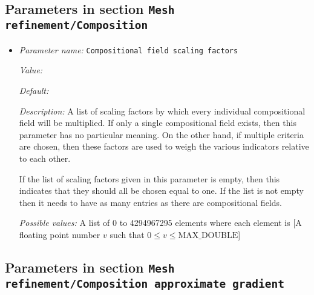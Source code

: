 \subsection{Parameters in section \tt Mesh refinement/Composition}
\label{parameters:Mesh_20refinement/Composition}

\begin{itemize}
\item {\it Parameter name:} {\tt Compositional field scaling factors}
\label{parameters:Mesh refinement/Composition/Compositional field scaling factors}
\label{parameters:Mesh_20refinement/Composition/Compositional_20field_20scaling_20factors}


{\it Value:} 


{\it Default:} 


{\it Description:} A list of scaling factors by which every individual compositional field will be multiplied. If only a single compositional field exists, then this parameter has no particular meaning. On the other hand, if multiple criteria are chosen, then these factors are used to weigh the various indicators relative to each other. 

If the list of scaling factors given in this parameter is empty, then this indicates that they should all be chosen equal to one. If the list is not empty then it needs to have as many entries as there are compositional fields.


{\it Possible values:} A list of 0 to 4294967295 elements where each element is [A floating point number $v$ such that $0 \leq v \leq \text{MAX\_DOUBLE}$]
\end{itemize}

\subsection{Parameters in section \tt Mesh refinement/Composition approximate gradient}
\label{parameters:Mesh_20refinement/Composition_20approximate_20gradient}

